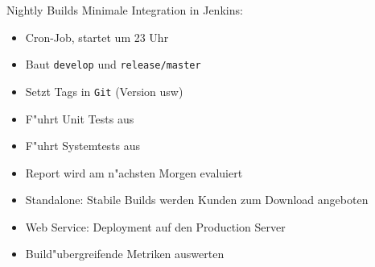 \documentclass{beamer}
\begin{document}
\begin{frame}{Nightly Builds}
	Minimale Integration in Jenkins:
	\begin{itemize}
		\item Cron-Job, startet um 23 Uhr
		\item Baut \texttt{develop} und \texttt{release/master}
		\item Setzt Tags in \texttt{Git} (Version usw)
		\item F"uhrt Unit Tests aus
		\item F"uhrt Systemtests aus
		\item Report wird am n"achsten Morgen evaluiert
		\item Standalone: Stabile Builds werden Kunden zum Download angeboten
		\item Web Service: Deployment auf den Production Server
		\item Build"ubergreifende Metriken auswerten
	\end{itemize}
\end{frame}
\end{document}
